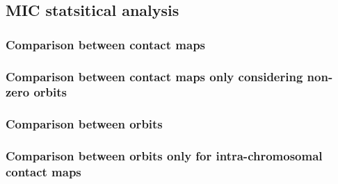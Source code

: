 \documentclass[11pt]{article}
\begin{document}
    \subsection{MIC statsitical analysis}\label{mic-statsitical-analysis}

    \subsubsection{Comparison between contact
maps}\label{comparison-between-contact-maps}

    \subsubsection{Comparison between contact maps only considering non-zero
orbits}\label{comparison-between-contact-maps-only-considering-non-zero-orbits}

    \subsubsection{Comparison between
orbits}\label{comparison-between-orbits}

    \subsubsection{Comparison between orbits only for intra-chromosomal
contact
maps}\label{comparison-between-orbits-only-for-intra-chromosomal-contact-maps}
\end{document}
